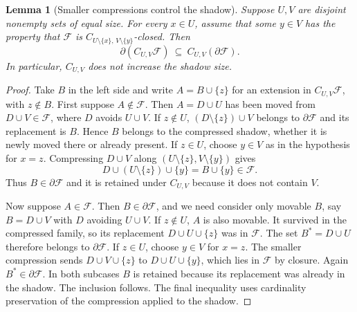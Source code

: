 \documentclass[11pt,oneside,openany]{book}
\theoremstyle{plain}
\newtheorem{lemma}[theorem]{Lemma}
\theoremstyle{definition}
\theoremstyle{remark}
\begin{document}
\begin{lemma}[Smaller compressions control the shadow]\label{p205:uv-shadow}
Suppose \(U,V\) are disjoint nonempty sets of equal size. For every
\(x\in U\), assume that some \(y\in V\) has the property that
\(\mathcal F\) is \(C_{U\setminus\{x\},\,V\setminus\{y\}}\)-closed.
Then
\[
 \partial(C_{U,V}\mathcal F)
   \ \subseteq\ C_{U,V}(\partial\mathcal F).
\]
In particular, \(C_{U,V}\) does not increase the shadow size.
\end{lemma}
\begin{proof}
Take \(B\) in the left side and write \(A=B\cup\{z\}\) for an
extension in \(C_{U,V}\mathcal F\), with \(z\notin B\).
First suppose \(A\notin\mathcal F\). Then
\(A=D\cup U\) has been moved from \(D\cup V\in\mathcal F\),
where \(D\) avoids \(U\cup V\). If \(z\notin U\),
\((D\setminus\{z\})\cup V\) belongs to \(\partial\mathcal F\)
and its replacement is \(B\). Hence \(B\) belongs to the
compressed shadow, whether it is newly moved there or already
present. If \(z\in U\), choose \(y\in V\) as in the hypothesis
for \(x=z\). Compressing \(D\cup V\) along
\((U\setminus\{z\}, V\setminus\{y\})\) gives
\[
   D\cup(U\setminus\{z\})\cup\{y\}=B\cup\{y\}\in\mathcal F.
\]
Thus \(B\in\partial\mathcal F\) and it is retained under \(C_{U,V}\)
because it does not contain \(V\).

Now suppose \(A\in\mathcal F\). Then \(B\in\partial\mathcal F\), and
we need consider only movable \(B\), say \(B=D\cup V\)
with \(D\) avoiding \(U\cup V\). If \(z\notin U\),
\(A\) is also movable. It survived in the compressed family, so its
replacement \(D\cup U\cup\{z\}\) was in \(\mathcal F\).
The set \(B^*=D\cup U\) therefore belongs to \(\partial\mathcal F\).
If \(z\in U\), choose \(y\in V\) for \(x=z\). The smaller
compression sends \(D\cup V\cup\{z\}\) to
\(D\cup U\cup\{y\}\), which lies in \(\mathcal F\) by closure.
Again \(B^*\in\partial\mathcal F\). In both subcases \(B\) is
retained because its replacement was already in the shadow.
The inclusion follows. The final inequality uses cardinality
preservation of the compression applied to the shadow.
\end{proof}
\end{document}
